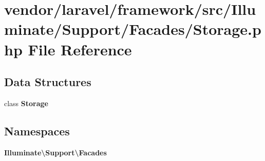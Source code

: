 \section{vendor/laravel/framework/src/\+Illuminate/\+Support/\+Facades/\+Storage.php File Reference}
\label{_storage_8php}
\subsection*{Data Structures}
\begin{DoxyCompactItemize}
\item 
class {\bf Storage}
\end{DoxyCompactItemize}
\subsection*{Namespaces}
\begin{DoxyCompactItemize}
\item 
 {\bf Illuminate\textbackslash{}\+Support\textbackslash{}\+Facades}
\end{DoxyCompactItemize}
